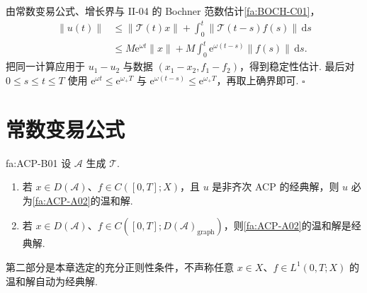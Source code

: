 \begin{FAProof}
由常数变易公式、增长界与 II-04 的 Bochner 范数估计\autoref{fa:BOCH-C01}，
\[
\begin{aligned}
\|u(t)\|
&\leqslant
\|\mathcal T(t)x\|
+
\int_0^t\|\mathcal T(t-s)f(s)\|\,\mathrm{d}s\\
&\leqslant
M\mathrm{e}^{\omega t}\|x\|
+
M\int_0^t\mathrm{e}^{\omega(t-s)}\|f(s)\|\,\mathrm{d}s.
\end{aligned}
\]
把同一计算应用于 \(\displaystyle u_1-u_2\) 与数据 \(\displaystyle(x_1-x_2,f_1-f_2)\)，得到稳定性估计. 最后对 \(\displaystyle0\leqslant s\leqslant t\leqslant T\) 使用 \(\displaystyle\mathrm{e}^{\omega t}\leqslant\mathrm{e}^{\omega_+T}\) 与 \(\displaystyle\mathrm{e}^{\omega(t-s)}\leqslant\mathrm{e}^{\omega_+T}\)，再取上确界即可.
\hfill\(\square\)
\end{FAProof}

\section{常数变易公式}\label{sec:ii11-variation}

\begin{FATheorem}[B][经典与温和的比较]{fa:ACP-B01}
设 \(\displaystyle\mathcal A\) 生成 \(\displaystyle\mathcal T\).
\begin{enumerate}[label=\textup{(\Alph*)}]
\item 若 \(\displaystyle x\in D(\mathcal A)\)、\(\displaystyle f\in C([0,T];X)\)，且 \(\displaystyle u\) 是非齐次 ACP 的经典解，则 \(\displaystyle u\) 必为\autoref{fa:ACP-A02}的温和解.
\item 若 \(\displaystyle x\in D(\mathcal A)\)、\(\displaystyle f\in C([0,T];D(\mathcal A)_{\mathrm{graph}})\)，则\autoref{fa:ACP-A02}的温和解是经典解.
\end{enumerate}
第二部分是本章选定的充分正则性条件，不声称任意 \(\displaystyle x\in X\)、\(\displaystyle f\in L^1(0,T;X)\) 的温和解自动为经典解.
\end{FATheorem}

